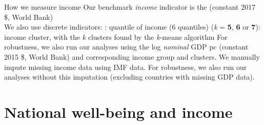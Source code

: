 \documentclass[aspectratio=169,xcolor=dvipsnames, 11pt,mathserif]{beamer}
\begin{document}
\begin{frame}{How we measure income}    
    \bbsp %
    \ip Our benchmark \textit{income} indicator is the  (constant 2017 \$, World Bank) \pause \\ We also use discrete indicators: \pause \bbsp
    \ip \textbf{}: quantile of income (6 quantiles)
    \ip \textbf{} (\textit{k} = \textbf{5}, \textbf{6} or \textbf{7}): income cluster, with the \textit{k} clusters found by the \textit{k}-means algorithm
    \ee
    \ip For robustness, we also run our analyses using the log \textit{nominal} GDP pc (constant 2015 \$, World Bank) and corresponding income group and clusters.
    \ip We manually impute missing income data using IMF data.
    \bbsp \ip For robustness, we also run our analyses without this imputation (excluding countries with missing GDP data).
    \ee
    \ee 
\end{frame}

\section{National well-being and income}
\end{document}
